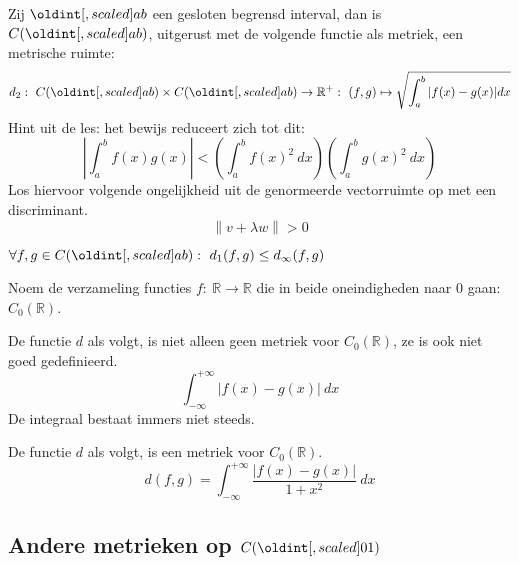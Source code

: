 \documentclass[main.tex]{subfiles}
\begin{document}
\begin{vb}
  Zij $\interval{a}{b}$ een gesloten begrensd interval, dan is $C(\interval{a}{b})$, uitgerust met de volgende functie als metriek, een metrische ruimte:
  \[ d_{2}:\ C(\interval{a}{b})\times C(\interval{a}{b}) \rightarrow \mathbb{R}^{+}:\ (f,g) \mapsto \sqrt{\int_{a}^{b}|f(x)-g(x)|dx} \]
  Hint uit de les: het bewijs reduceert zich tot dit:
  \[ \left|\int_{a}^{b}f(x)g(x)\right| < \left(\int_{a}^{b}f(x)^{2}\ dx \right) \left(\int_{a}^{b}g(x)^{2}\ dx \right) \]
  Los hiervoor volgende ongelijkheid uit de genormeerde vectorruimte op met een discriminant.
  \[ \left\| v+\lambda w \right\| > 0 \]
\end{vb}

\begin{st}
  $\forall f,g \in C(\interval{a}{b}):\ d_{1}(f,g) \le d_{\infty}(f,g)$
\end{st}

\begin{de}
  Noem de verzameling functies $f:\ \mathbb{R} \rightarrow \mathbb{R}$ die in beide oneindigheden naar $0$ gaan: $C_{0}(\mathbb{R})$.
\end{de}

\begin{vb}
  De functie $d$ als volgt, is niet alleen geen metriek voor $C_{0}(\mathbb{R})$, ze is ook niet goed gedefinieerd.
  \[ \int_{-\infty}^{+\infty}|f(x)-g(x)|\ dx \]
  De integraal bestaat immers niet steeds.
\end{vb}

\begin{vb}
  De functie $d$ als volgt, is een metriek voor $C_{0}(\mathbb{R})$.
  \[ d(f,g) = \int_{-\infty}^{+\infty}\frac{|f(x)-g(x)|}{1+x^{2}}\ dx \]
\end{vb}

\subsection{Andere metrieken op $C(\interval{0}{1})$}
\label{sec:andere-metrieken-op}
\end{document}
